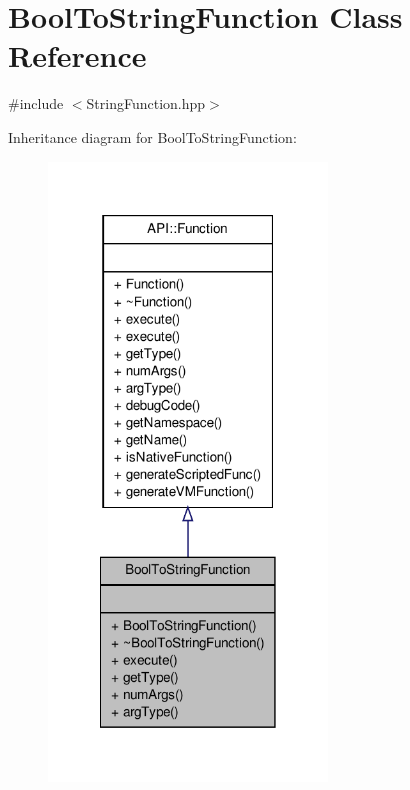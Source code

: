 \hypertarget{class_bool_to_string_function}{\section{Bool\-To\-String\-Function Class Reference}
\label{class_bool_to_string_function}
}


{\ttfamily \#include $<$String\-Function.\-hpp$>$}



Inheritance diagram for Bool\-To\-String\-Function\-:
\nopagebreak
\begin{figure}[H]
\begin{center}
\leavevmode
\includegraphics[width=210pt]{class_bool_to_string_function__inherit__graph}
\end{center}
\end{figure}


